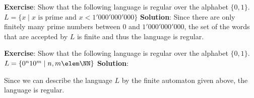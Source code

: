 \documentclass[10pt,a4paper,english]{article}
\begin{document}


    \newpage


    \textbf{Exercise}:\newline
    Show that the following language is regular over the alphabet $ \{0,1\} $.\newline
    $L=\{x \mid x \text{ is prime and } x < 1'000'000'000\}$\newline\newline
    \textbf{Solution}:\newline
    Since there are only finitely many prime numbers between $0$ and $1'000'000'000$, the set of the words that are accepted by $L$
    is finite and thus the language is regular.\newline


    \textbf{Exercise}:\newline
    Show that the following language is regular over the alphabet $ \{0,1\} $.\newline
    $L=\{0^n 10^m \mid n,m \elem \NN \}$\newline\newline
    \textbf{Solution}:\newline
    \begin{figure}[h]
        \centering
    \end{figure}

    Since we can describe the language $L$ by the finite automaton given above, the language is regular.\newline




    \newpage



    \newpage
    \printindex
\end{document}
